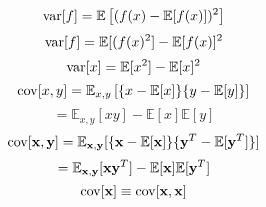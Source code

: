 $${\rm var}[f]=\mathbb{E}\left[ (f(x)-\mathbb{E}[f(x)])^{2} \right]$$
$${\rm var}[f]=\mathbb{E}[(f(x)^{2}]-\mathbb{E}[f(x)]^{2}$$
$${\rm var}[x]=\mathbb{E}[x^{2}]-\mathbb{E}[x]^{2}$$
$${\rm cov}[x,y]=\mathbb{E}_{x,y}\left[\{x-\mathbb{E}[x]\}\{y-\mathbb{E}[y]\}\right]$$
$$=\mathbb{E}_{x,y}[xy]-\mathbb{E}[x]\mathbb{E}[y]$$
$${\rm cov}[{\bf x},{\bf y}]=\mathbb{E}_{{\bf x},{\bf y}}[\{{\bf x}-\mathbb{E}[{\bf x}]\}\{{\bf y}^{T}-\mathbb{E}[{\bf y}^{T}]\}]$$
$$=\mathbb{E}_{{\bf x},{\bf y}}[{\bf x}{\bf y}^{T}]-\mathbb{E}[{\bf x}]\mathbb{E}[{\bf y}^{T}]$$
$${\rm cov}[{\bf x}]\equiv {\rm cov}[{\bf x},{\bf x}]$$
